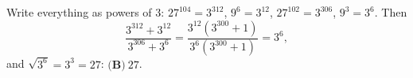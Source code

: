 Write everything as powers of $3$: $27^{104}=3^{312}$, $9^6=3^{12}$, $27^{102}=3^{306}$, $9^3=3^6$. Then
\[\dfrac{3^{312}+3^{12}}{3^{306}+3^{6}}=\dfrac{3^{12}\left(3^{300}+1\right)}{3^{6}\left(3^{300}+1\right)}=3^6,\]
and $\sqrt{3^6}=3^3=27$: $\boxed{\textbf{(B)}\ 27}$.
